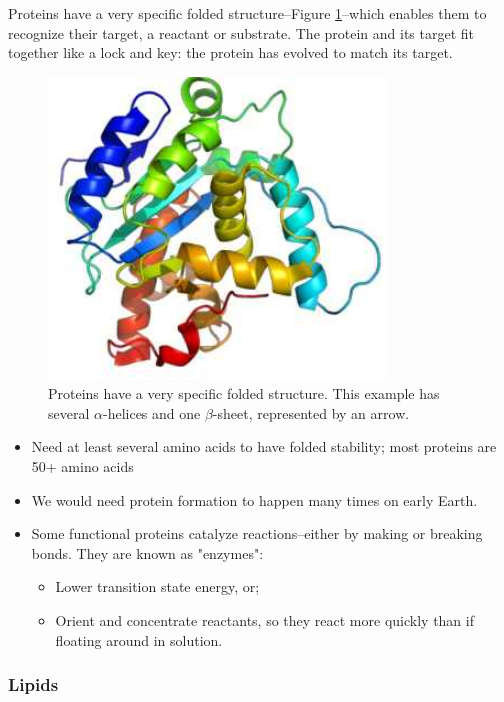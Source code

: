 \documentclass[]{article}
\begin{document}
Proteins have a very specific folded structure--Figure \ref{fig:proteinStructure}--which enables them to recognize their target, a reactant or substrate. The protein and its target fit together like a lock and key: the protein has evolved to match its target.

\begin{figure}[H]
	\caption[Proteins have a very specific folded structure]{Proteins have a very specific folded structure. This example has several $\alpha$-helices and one $\beta$-sheet, represented by an arrow.}\label{fig:proteinStructure}
	\includegraphics[width=0.8\textwidth]{proteinStructure}
\end{figure}

\begin{itemize}
	\item  Need at least several amino acids to have folded stability; most proteins are 50+ amino acids
	\item We would need protein formation to happen many times on early Earth.
	\item Some functional proteins catalyze reactions--either by making or breaking bonds. They are known as "enzymes":
	\begin{itemize}
		\item Lower transition state energy, or;
		\item Orient and concentrate reactants, so they react more quickly than if floating around in solution.
	\end{itemize}
\end{itemize}


\subsubsection{Lipids}
\end{document}
